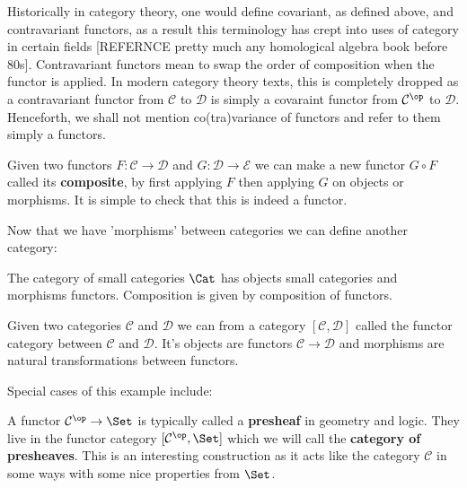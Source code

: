 \begin{remark}
    Historically in category theory, one would define covariant, as defined above, and contravariant functors, as a result this terminology has crept into uses of category in certain fields [REFERNCE pretty much any homological algebra book before 80s]. Contravariant functors mean to swap the order of composition when the functor is applied. In modern category theory texts, this is completely dropped as a contravariant functor from $\mathcal{C}$ to $\mathcal{D}$ is simply a covaraint functor from $\mathcal{C}^\op$ to $\mathcal{D}$. Henceforth, we shall not mention co(tra)variance of functors and refer to them simply a functors.
\end{remark}

\begin{remark}
    Given two functors $F : \mathcal{C} \to \mathcal{D}$ and $G : \mathcal{D} \to \mathcal{E}$ we can make a new functor $G \circ F$ called its \textbf{composite}, by first applying $F$ then applying $G$ on objects or morphisms. It is simple to check that this is indeed a functor. 
\end{remark}

Now that we have 'morphisms' between categories we can define another category:

\begin{example}
	The category of small categories $\Cat$ has objects small categories and morphisms functors. Composition is given by composition of functors.
\end{example}

\begin{defin}
\end{defin}

\begin{example}
    Given two categories $\mathcal{C}$ and $\mathcal{D}$ we can from a category $[\mathcal{C}, \mathcal{D}]$ called the functor category between $\mathcal{C}$ and $\mathcal{D}$. It's objects are functors $\mathcal{C} \to \mathcal{D}$ and morphisms are natural transformations between functors.
\end{example}

Special cases of this example include:

\begin{example}
    A functor $\mathcal{C}^\op \to \Set$ is typically called a \textbf{presheaf} in geometry and logic. They live in the functor category $[\mathcal{C}^\op, \Set]$ which we will call the \textbf{category of presheaves}. This is an interesting construction as it acts like the category $\mathcal{C}$ in some ways with some nice properties from $\Set$.
\end{example}

